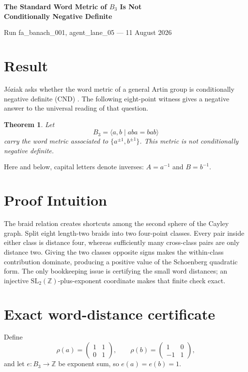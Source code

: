 \documentclass[10pt]{article}
\newtheorem{theorem}{Theorem}
\newcommand{\B}{B_3}
\begin{document}
\begin{center}
{\Large\bfseries The Standard Word Metric of $B_3$ Is Not\\
Conditionally Negative Definite\par}
\smallskip
{\small Run fa\_banach\_001, agent\_lane\_05 --- 11 August 2026}
\end{center}
\vspace{-0.7em}

\section*{Result}

J\'oziak asks whether the word metric of a general Artin group is
conditionally negative definite (CND) \cite[p.~2]{Joziak}.  The following
eight-point witness gives a negative answer to the universal reading of that
question.

\begin{theorem}
Let
\[
 \B=\langle a,b\mid aba=bab\rangle
\]
carry the word metric associated to
\(\{a^{\pm1},b^{\pm1}\}\).  This metric is not conditionally negative
definite.
\end{theorem}

Here and below, capital letters denote inverses: \(A=a^{-1}\) and
\(B=b^{-1}\).

\section*{Proof Intuition}

The braid relation creates shortcuts among the second sphere of the Cayley
graph.  Split eight length-two braids into two four-point classes.  Every pair
inside either class is distance four, whereas sufficiently many cross-class
pairs are only distance two.  Giving the two classes opposite signs makes the
within-class contribution dominate, producing a positive value of the
Schoenberg quadratic form.  The only bookkeeping issue is certifying the
small word distances; an injective \(\mathrm{SL}_2(\mathbb Z)\)-plus-exponent
coordinate makes that finite check exact.

\section*{Exact word-distance certificate}

Define
\[
 \rho(a)=\begin{pmatrix}1&1\\0&1\end{pmatrix},\qquad
 \rho(b)=\begin{pmatrix}1&0\\-1&1\end{pmatrix},
\]
and let \(e:\B\to\mathbb Z\) be exponent sum, so \(e(a)=e(b)=1\).
\end{document}
